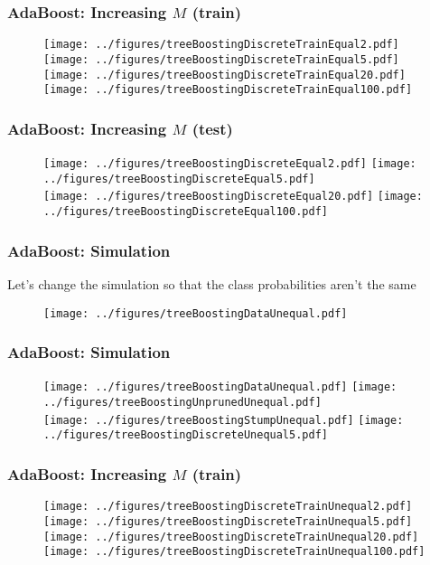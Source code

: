 \documentclass[12pt]{beamer}
\begin{document}
\begin{frame}[fragile]
\frametitle{AdaBoost: Increasing $M$ (train)}
\begin{figure}
\texttt{[image: ../figures/treeBoostingDiscreteTrainEqual2.pdf]}
\texttt{[image: ../figures/treeBoostingDiscreteTrainEqual5.pdf]} \\
\texttt{[image: ../figures/treeBoostingDiscreteTrainEqual20.pdf]}
\texttt{[image: ../figures/treeBoostingDiscreteTrainEqual100.pdf]}
\end{figure}
\end{frame}


\begin{frame}[fragile]
\frametitle{AdaBoost: Increasing $M$ (test)}
\begin{figure}
\texttt{[image: ../figures/treeBoostingDiscreteEqual2.pdf]}
\texttt{[image: ../figures/treeBoostingDiscreteEqual5.pdf]} \\
\texttt{[image: ../figures/treeBoostingDiscreteEqual20.pdf]}
\texttt{[image: ../figures/treeBoostingDiscreteEqual100.pdf]}
\end{figure}
\end{frame}

\begin{frame}[fragile]
\frametitle{AdaBoost: Simulation}
Let's change the simulation so that the class probabilities aren't the same
\begin{figure}
\texttt{[image: ../figures/treeBoostingDataUnequal.pdf]}
\end{figure}
\end{frame}

\begin{frame}[fragile]
\frametitle{AdaBoost: Simulation}
\begin{figure}
\texttt{[image: ../figures/treeBoostingDataUnequal.pdf]}
\texttt{[image: ../figures/treeBoostingUnprunedUnequal.pdf]} \\
\texttt{[image: ../figures/treeBoostingStumpUnequal.pdf]}
\texttt{[image: ../figures/treeBoostingDiscreteUnequal5.pdf]}
\end{figure}
\end{frame}

\begin{frame}[fragile]
\frametitle{AdaBoost: Increasing $M$ (train)}
\begin{figure}
\texttt{[image: ../figures/treeBoostingDiscreteTrainUnequal2.pdf]}
\texttt{[image: ../figures/treeBoostingDiscreteTrainUnequal5.pdf]} \\
\texttt{[image: ../figures/treeBoostingDiscreteTrainUnequal20.pdf]}
\texttt{[image: ../figures/treeBoostingDiscreteTrainUnequal100.pdf]}
\end{figure}
\end{frame}
\end{document}
